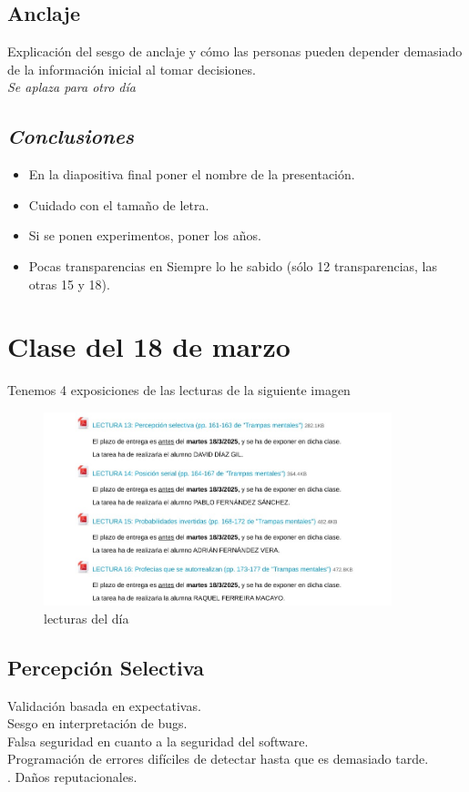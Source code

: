 \documentclass[12pt, a4paper, twoside]{article}
\begin{document}
\subsection{Anclaje}
Explicación del sesgo de anclaje y cómo las personas pueden depender demasiado de la información inicial al tomar decisiones.\\
\textit{Se aplaza para otro día}


\subsection{\textit{Conclusiones}}
\begin{itemize}
    \item En la diapositiva final poner el nombre de la presentación.
    \item Cuidado con el tamaño de letra.
    \item Si se ponen experimentos, poner los años.
    \item Pocas transparencias en Siempre lo he sabido (sólo 12 transparencias, las otras 15 y 18).

\end{itemize}

\section{Clase del 18 de marzo}

Tenemos 4 exposiciones de las lecturas de la siguiente imagen
\begin{figure}[h]
    \centering
    \includegraphics[width=0.9\textwidth]{./Images/0318.jpg}
    \caption{lecturas del día}
\end{figure}
\subsection{Percepción Selectiva}
Validación basada en expectativas.\\
Sesgo en interpretación de bugs.\\
Falsa seguridad en cuanto a la seguridad del software.\\
Programación de errores difíciles de detectar hasta que es demasiado tarde.\\.
Daños reputacionales.\\
\end{document}
